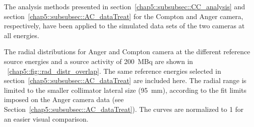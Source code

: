The analysis methods presented in section~\ref{chap5::subsubsec::CC_analysis} and section~\ref{chap5::subsubsec::AC_dataTreat} for the Compton and Anger camera, respectively, have been applied to the simulated data sets of the two cameras at all energies.

The radial distributions for Anger and Compton camera at the different reference source energies and a source activity of 200~MBq are shown in \figurename~\ref{chap5::fig::rad_distr_overlap}. The same reference energies selected in section~\ref{chap5::subsubsec::AC_dataTreat} are included here. The radial range is limited to the smaller collimator lateral size (95~mm), according to the fit limits imposed on the Anger camera data (see Section~\ref{chap5::subsubsec::AC_dataTreat}). The curves are normalized to 1 for an easier visual comparison.

